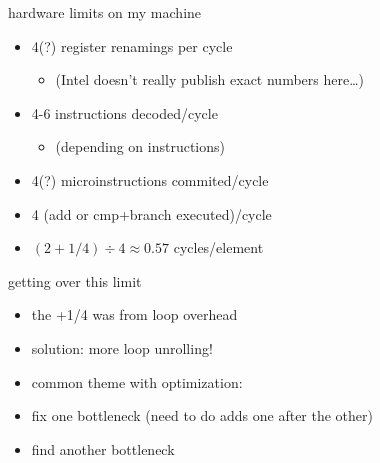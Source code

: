 \begin{frame}{hardware limits on my machine}
    \begin{itemize}
    \item 4(?) register renamings per cycle
        \begin{itemize}
        \item (Intel doesn't really publish exact numbers here\ldots)
        \end{itemize}
    \item 4-6 instructions decoded/cycle
        \begin{itemize}
        \item (depending on instructions)
        \end{itemize}
    \item 4(?) microinstructions commited/cycle
    \item 4 (add or cmp+branch executed)/cycle
    \vspace{.5cm}
    \item<2-> $(2 + 1/4) \div 4 \approx 0.57$ cycles/element
    \end{itemize}
\end{frame}

\begin{frame}{getting over this limit}
    \begin{itemize}
    \item the +1/4 was from loop overhead
    \vspace{.5cm}
    \item solution: more loop unrolling!
    \vspace{.5cm}
    \item common theme with optimization:
    \item fix one bottleneck (need to do adds one after the other)
    \item find another bottleneck
    \end{itemize}
\end{frame}
